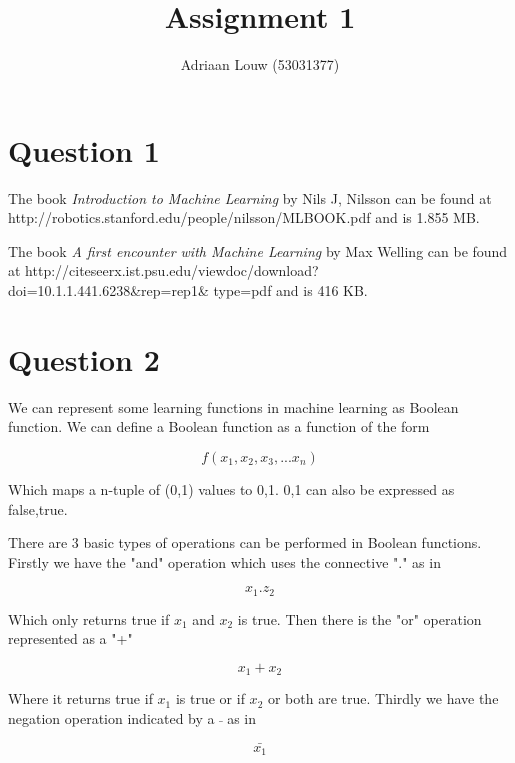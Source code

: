 \documentclass[10pt,a4paper]{article}
\title{Assignment 1}
\author{ Adriaan Louw (53031377)}
\begin{document}
\maketitle

\tableofcontents

\section{Question 1}

The book \emph{Introduction to Machine Learning} by Nils J, Nilsson can be found at
http://robotics.stanford.edu/people/nilsson/MLBOOK.pdf and is 1.855 MB.

The book \emph{A first encounter with Machine Learning} by Max Welling can be found at 
http://citeseerx.ist.psu.edu/viewdoc/download?doi=10.1.1.441.6238\&rep=rep1\&
type=pdf and is 416 KB.

\section{Question 2}

We can represent some learning functions in machine learning as Boolean function. We can define a Boolean function as a function of the form

\begin{equation}
f(x_1,x_2,x_3,...x_n)
\end{equation}

Which maps a n-tuple of (0,1) values to {0,1}. {0,1} can also be expressed as {false,true}.

There are 3 basic types of operations can be performed in Boolean functions. Firstly we have the "and" operation which uses the connective "." as in

\begin{equation}
x_1.z_2
\end{equation}

Which only returns true if $x_1$ and $x_2$ is true. Then there is the "or" operation represented as a "+"

\begin{equation}
x_1+x_2
\end{equation}

Where it returns true if $x_1$ is true or if $x_2$ or both are true. Thirdly we have the negation operation indicated by a $\bar{}$ as in 

\begin{equation}
\bar{x_1}
\end{equation}
\end{document}
